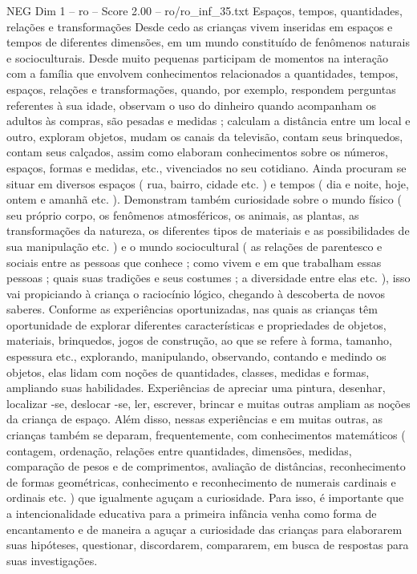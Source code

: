 \begin{textsample}{NEG Dim 1 – ro – Score 2.00 – ro/ro\_inf\_35.txt}  \label{ex:f1_neg_156}
Espaços, tempos, quantidades, relações e transformações Desde cedo as crianças vivem inseridas em espaços e tempos de diferentes dimensões, em um mundo constituído de fenômenos naturais e socioculturais.
Desde muito pequenas participam de momentos na interação com a família que envolvem conhecimentos relacionados a quantidades, tempos, espaços, relações e transformações, quando, por exemplo, respondem perguntas referentes à sua idade, observam o uso do dinheiro quando acompanham os adultos às compras, são pesadas e medidas ; calculam a distância entre um local e outro, exploram objetos, mudam os canais da televisão, contam seus brinquedos, contam seus calçados, assim como elaboram conhecimentos sobre os números, espaços, formas e medidas, etc., vivenciados no seu cotidiano.
Ainda procuram se situar em diversos espaços ( rua, bairro, cidade etc. ) e tempos ( dia e noite, hoje, ontem e amanhã etc. ).
Demonstram também curiosidade sobre o mundo físico ( seu próprio corpo, os fenômenos atmosféricos, os animais, as plantas, as transformações da natureza, os diferentes tipos de materiais e as possibilidades de sua manipulação etc. ) e o mundo sociocultural ( as relações de parentesco e sociais entre as pessoas que conhece ; como vivem e em que trabalham essas pessoas ; quais suas tradições e seus costumes ; a diversidade entre elas etc. ), isso vai propiciando à criança o raciocínio lógico, chegando à descoberta de novos saberes.
Conforme as experiências oportunizadas, nas quais as crianças têm oportunidade de explorar diferentes características e propriedades de objetos, materiais, brinquedos, jogos de construção, ao que se refere à forma, tamanho, espessura etc., explorando, manipulando, observando, contando e medindo os objetos, elas lidam com noções de quantidades, classes, medidas e formas, ampliando suas habilidades.
Experiências de apreciar uma pintura, desenhar, localizar -se, deslocar -se, ler, escrever, brincar e muitas outras ampliam as noções da criança de espaço.
Além disso, nessas experiências e em muitas outras, as crianças também se deparam, frequentemente, com conhecimentos matemáticos ( contagem, ordenação, relações entre quantidades, dimensões, medidas, comparação de pesos e de comprimentos, avaliação de distâncias, reconhecimento de formas geométricas, conhecimento e reconhecimento de numerais cardinais e ordinais etc. ) que igualmente aguçam a curiosidade.
Para isso, é importante que a intencionalidade educativa para a primeira infância venha como forma de encantamento e de maneira a aguçar a curiosidade das crianças para elaborarem suas hipóteses, questionar, discordarem, compararem, em busca de respostas para suas investigações.

\end{textsample}
